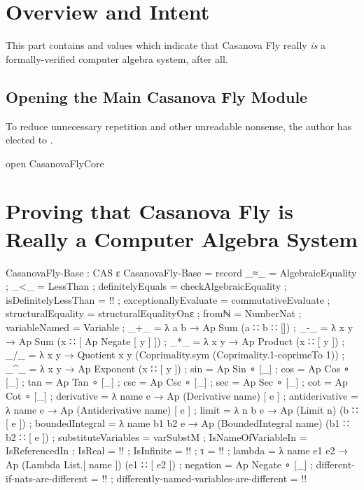 \documentclass{report}
\begin{document}
\chapter{Overview and Intent}
This part contains  and  values which indicate that Casanova Fly really \emph{is} a formally-verified computer algebra system, after all.

\section{Opening the Main Casanova Fly Module}
To reduce unnecessary repetition and other unreadable nonsense, the author has elected to  .

\begin{code}
open CasanovaFlyCore
\end{code}

\chapter{Proving that Casanova Fly is Really a Computer Algebra System}

\begin{code}
CasanovaFly-Base : CAS ε
CasanovaFly-Base = record
  { _≈_ = AlgebraicEquality
  ; _<_ = LessThan
  ; definitelyEquals = checkAlgebraicEquality
  ; isDefinitelyLessThan = {!!}
  ; exceptionallyEvaluate = commutativeEvaluate
  ; structuralEquality = structuralEqualityOnε
  ; fromℕ = NumberNat
  ; variableNamed = Variable
  ; _+_ = λ a b → Ap Sum (a ∷ b ∷ [])
  ; _-_ = λ x y → Ap Sum (x ∷ [ Ap Negate [ y ] ])
  ; _*_ = λ x y → Ap Product (x ∷ [ y ])
  ; _/_ = λ x y → Quotient x y (Coprimality.sym (Coprimality.1-coprimeTo 1))
  ; _^_ = λ x y → Ap Exponent (x ∷ [ y ])
  ; sin = Ap Sin ∘ [_]
  ; cos = Ap Cos ∘ [_]
  ; tan = Ap Tan ∘ [_]
  ; csc = Ap Csc ∘ [_]
  ; sec = Ap Sec ∘ [_]
  ; cot = Ap Cot ∘ [_]
  ; derivative = λ name e → Ap (Derivative name) [ e ]
  ; antiderivative = λ name e → Ap (Antiderivative name) [ e ]
  ; limit = λ n b e → Ap (Limit n) (b ∷ [ e ])
  ; boundedIntegral = λ name b1 b2 e → Ap (BoundedIntegral name) (b1 ∷ b2 ∷ [ e ])
  ; substituteVariables = varSubstM
  ; IsNameOfVariableIn = IsReferencedIn
  ; IsReal = {!!}
  ; IsInfinite = {!!}
  ; τ = {!!}
  ; lambda = λ name e1 e2 → Ap (Lambda List.[ name ]) (e1 ∷ [ e2 ])
  ; negation = Ap Negate ∘ [_]
  ; different-if-nats-are-different = {!!}
  ; differently-named-variables-are-different = {!!}
  }
\end{code}
\end{document}
